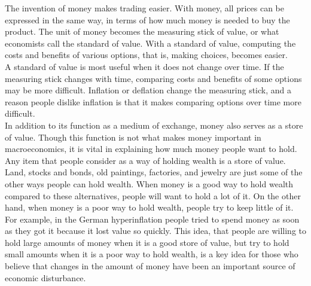 The invention of money makes trading easier. With money, all prices can be expressed in the same way, in terms of how much money is needed to buy the product. The unit of money becomes the measuring stick of value, or what economists call the standard of value. With a standard of value, computing the costs and benefits of various options, that is, making choices, becomes easier. \\ 
A standard of value is most useful when it does not change over time. If the measuring stick changes with time, comparing costs and benefits of some options may be more difficult. Inflation or deflation change the measuring stick, and a reason people dislike inflation is that it makes comparing options over time more difficult. \\
In addition to its function as a medium of exchange, money also serves as a store of value. Though this function is not what makes money important in macroeconomics, it is vital in explaining how much money people want to hold. Any item that people consider as a way of holding wealth is a store of value. Land, stocks and bonds, old paintings, factories, and jewelry are just some of the other ways people can hold wealth. When money is a good way to hold wealth compared to these alternatives, people will want to hold a lot of it. On the other hand, when money is a poor way to hold wealth, people try to keep little of it. For example, in the German hyperinflation people tried to spend money as soon as they got it because it lost value so quickly. This idea, that people are willing to hold large amounts of money when it is a good store of value, but try to hold small amounts when it is a poor way to hold wealth, is a key idea for those who believe that changes in the amount of money have been an important source of economic disturbance.

